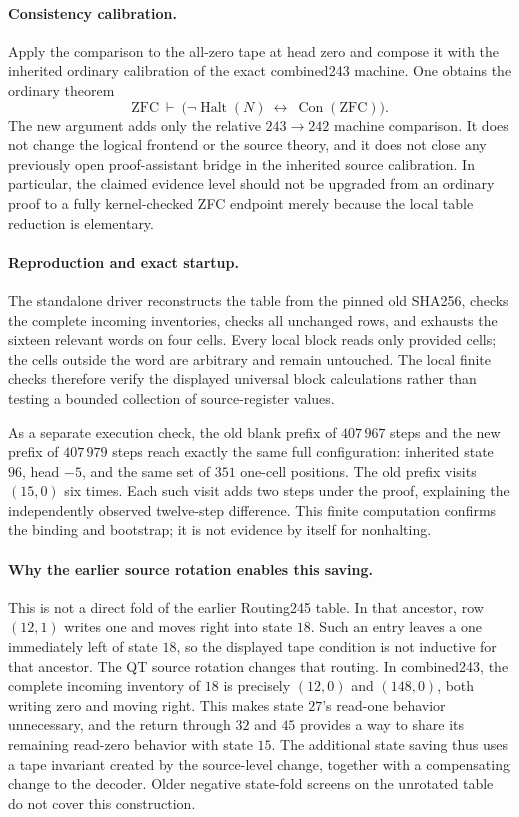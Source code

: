 \paragraph{Consistency calibration.}
Apply the comparison to the all-zero tape at head zero and compose it
with the inherited ordinary calibration of the exact combined243
machine. One obtains the ordinary theorem
\[
 \mathrm{ZFC}\ \vdash\
 \bigl(\neg\operatorname{Halt}(N)\ \longleftrightarrow\
 \operatorname{Con}(\mathrm{ZFC})\bigr).
\]
The new argument adds only the relative $243\to242$ machine comparison.
It does not change the logical frontend or the source theory, and it
does not close any previously open proof-assistant bridge in the inherited
source calibration. In particular, the claimed evidence level should not
be upgraded from an ordinary proof to a fully kernel-checked ZFC endpoint
merely because the local table reduction is elementary.

\paragraph{Reproduction and exact startup.}
The standalone driver reconstructs the table from the pinned old SHA256,
checks the complete incoming inventories, checks all unchanged rows, and
exhausts the sixteen relevant words on four cells. Every local block
reads only provided cells; the cells outside the word are arbitrary and
remain untouched. The local finite checks therefore verify the displayed
universal block calculations rather than testing a bounded collection
of source-register values.

As a separate execution check, the old blank prefix of $407\,967$ steps
and the new prefix of $407\,979$ steps reach exactly the same full
configuration: inherited state $96$, head $-5$, and the same set of $351$
one-cell positions. The old prefix visits $(15,0)$ six times. Each such
visit adds two steps under the proof, explaining the independently
observed twelve-step difference. This finite computation confirms the
binding and bootstrap; it is not evidence by itself for nonhalting.

\paragraph{Why the earlier source rotation enables this saving.}
This is not a direct fold of the earlier Routing245 table. In that
ancestor, row $(12,1)$ writes one and moves right into state $18$.
Such an entry leaves a one immediately left of state $18$, so the
displayed tape condition is not inductive for that ancestor. The QT source
rotation changes that routing. In combined243, the complete incoming
inventory of $18$ is precisely $(12,0)$ and $(148,0)$, both writing zero
and moving right. This makes state $27$'s read-one behavior unnecessary,
and the return through $32$ and $45$ provides a way to share its remaining
read-zero behavior with state $15$. The additional state saving thus
uses a tape invariant created by the source-level change, together with
a compensating change to the decoder. Older negative state-fold screens
on the unrotated table do not cover this construction.
